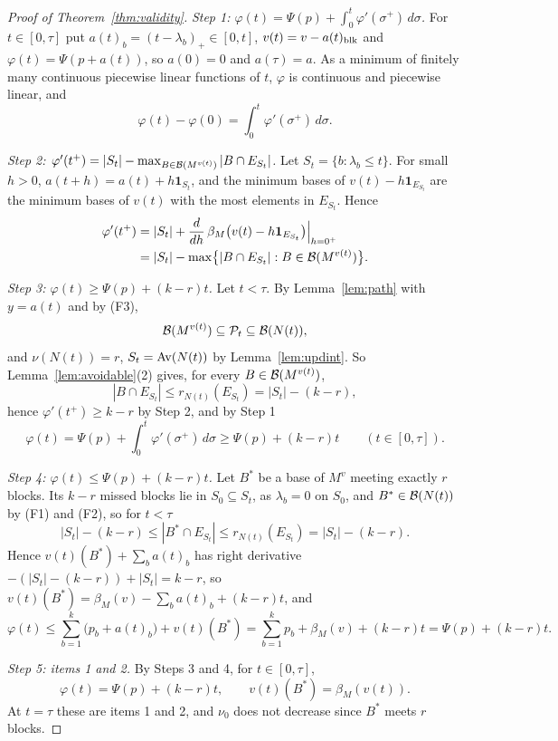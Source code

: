 \begin{proof}[Proof of Theorem~\ref{thm:validity}]
\emph{Step 1: $\varphi(t)=\Psi(p)+\int_0^{t}\varphi'(\sigma^{+})\,d\sigma$.}  For $t\in[0,\tau]$ put $a(t)_b=(t-\lambda_b)_+\in[0,t]$,
$v(t)=v-a(t)_{\operatorname{blk}}$ and $\varphi(t)=\Psi(p+a(t))$, so $a(0)=0$ and $a(\tau)=a$.
As a minimum of finitely many continuous piecewise linear functions of $t$,
$\varphi$ is continuous and piecewise linear, and
\[
  \varphi(t)-\varphi(0)=\int_0^{t}\varphi'(\sigma^{+})\,d\sigma.
\]

\emph{Step 2: $\varphi'(t^{+})=|S_t|-\max_{B\in\mathcal B(M^{v(t)})}|B\cap E_{S_t}|$.}  Let $S_t=\{b:\lambda_b\le t\}$.  For small
$h>0$, $a(t+h)=a(t)+h\mathbf 1_{S_t}$, and the minimum bases of
$v(t)-h\mathbf 1_{E_{S_t}}$ are the minimum bases of $v(t)$ with the most elements
in $E_{S_t}$.  Hence
\[
  \begin{aligned}
  \varphi'(t^{+})&=|S_t|+\frac{d}{dh}\,\beta_M\bigl(v(t)-h\mathbf 1_{E_{S_t}}\bigr)\Big|_{h=0^{+}}\\
  &=|S_t|-\max\bigl\{|B\cap E_{S_t}|:B\in\mathcal B(M^{v(t)})\bigr\}.
  \end{aligned}
\]

\emph{Step 3: $\varphi(t)\ge\Psi(p)+(k-r)t$.}  Let $t<\tau$.  By Lemma~\ref{lem:path} with
$y=a(t)$ and by (F3),
\[
  \mathcal B(M^{v(t)})\subseteq\mathcal P_t\subseteq\mathcal B(N(t)),
\]
and $\nu(N(t))=r$, $S_t=\operatorname{Av}(N(t))$ by Lemma~\ref{lem:updint}.  So Lemma~\ref{lem:avoidable}(2) gives, for every
$B\in\mathcal B(M^{v(t)})$,
\[
  |B\cap E_{S_t}|\le r_{N(t)}(E_{S_t})=|S_t|-(k-r),
\]
hence $\varphi'(t^{+})\ge k-r$ by Step 2, and by Step 1
\[
  \varphi(t)=\Psi(p)+\int_0^{t}\varphi'(\sigma^{+})\,d\sigma\ge\Psi(p)+(k-r)t\qquad(t\in[0,\tau]).
\]

\emph{Step 4: $\varphi(t)\le\Psi(p)+(k-r)t$.}  Let $B^{*}$ be a base of $M^{v}$ meeting exactly $r$
blocks.  Its $k-r$ missed blocks lie in $S_0\subseteq S_t$, as $\lambda_b=0$ on
$S_0$, and $B^{*}\in\mathcal B(N(t))$ by (F1) and (F2), so for $t<\tau$
\[
  |S_t|-(k-r)\le|B^{*}\cap E_{S_t}|\le r_{N(t)}(E_{S_t})=|S_t|-(k-r).
\]
Hence $v(t)(B^{*})+\sum_ba(t)_b$ has right derivative
$-(|S_t|-(k-r))+|S_t|=k-r$, so
$v(t)(B^{*})=\beta_M(v)-\sum_ba(t)_b+(k-r)t$, and
\[
  \varphi(t)\le\sum_{b=1}^{k}\bigl(p_b+a(t)_b\bigr)+v(t)(B^{*})
  =\sum_{b=1}^{k}p_b+\beta_M(v)+(k-r)t=\Psi(p)+(k-r)t.
\]

\emph{Step 5: items 1 and 2.}  By Steps 3 and 4, for $t\in[0,\tau]$,
\[
  \varphi(t)=\Psi(p)+(k-r)t,\qquad v(t)(B^{*})=\beta_M(v(t)).
\]
At $t=\tau$ these are items 1 and 2, and $\nu_0$ does not decrease since $B^{*}$
meets $r$ blocks.
\end{proof}

